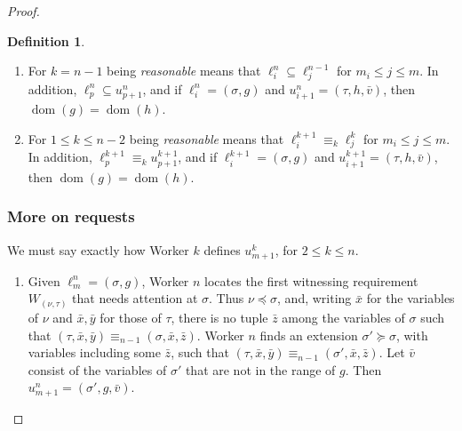 \documentclass[10pt,a4paper]{article}
\DeclareMathOperator{\dom}{dom}
\theoremstyle{definition}
\newtheorem{defn}[thm]{Definition}
\begin{document}
\begin{proof}
\begin{defn}
\begin{enumerate}
				\item For $k = n-1$ being \emph{reasonable} means that $\ell^n_i\subseteq\ell^{n-1}_j$ for $m_i\leq j\leq m$.  In addition, $\ell^n_p\subseteq u^n_{p+1}$, and if $\ell^n_i = (\sigma,g)$ and $u^n_{i+1} = (\tau,h,\bar{v})$, then $\dom(g) = \dom(h)$.
				
				\item For $1\leq k\leq n-2$ being \emph{reasonable} means that $\ell^{k+1}_i\equiv_k\ell^k_j$ for $m_i\leq j\leq m$. In addition, $\ell^{k+1}_p\equiv_k u^{k+1}_{p+1}$, and if $\ell^{k+1}_i = (\sigma,g)$ and $u^{k+1}_{i+1} = (\tau,h,\bar{v})$, then $\dom(g) = \dom(h)$.
				
			\end{enumerate}
			
		\end{defn} 
		
		\subsubsection{More on requests}
		
		We must say exactly how Worker $k$ defines $u^k_{m+1}$, for $2\leq k\leq n$.
		
		\begin{enumerate}
			
			\item Given $\ell^n_m = (\sigma,g)$, Worker $n$ locates the first
				witnessing requirement $W_{(\nu,\tau)}$ that needs attention at
				$\sigma$. Thus $\nu\preceq\sigma$, and, writing $\bar{x}$ for the
				variables of $\nu$ and $\bar{x},\bar{y}$ for those of $\tau$, there is
				no tuple $\bar{z}$ among the variables of $\sigma$ such that $(\tau,\bar{x},\bar{y})\equiv_{n-1}(\sigma,\bar{x},\bar{z})$.
				Worker $n$ finds an extension $\sigma'\succeq\sigma$, with variables
				including some $\bar{z}$, such that $(\tau,\bar{x},\bar{y})\equiv_{n-1}(\sigma',\bar{x},\bar{z})$.
				Let $\bar{v}$ consist of the variables of $\sigma'$ that are not in
				the range of $g$. Then $u^n_{m+1}=(\sigma',g,\bar{v})$.
			

\end{enumerate}
\end{proof}
\end{document}
